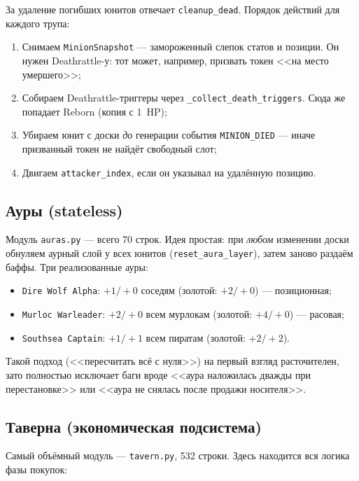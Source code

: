 \documentclass[a4paper,12pt]{extarticle}
\begin{document}
За удаление погибших юнитов отвечает \texttt{cleanup\_dead}. Порядок действий для каждого трупа:

\begin{enumerate}[noitemsep]
  \item Снимаем \texttt{MinionSnapshot} --- замороженный слепок статов и позиции. Он нужен Deathrattle-у: тот может, например, призвать токен <<на место умершего>>;
  \item Собираем Deathrattle-триггеры через \texttt{\_collect\_death\_triggers}. Сюда же попадает Reborn (копия с 1~HP);
  \item Убираем юнит с доски \emph{до} генерации события \texttt{MINION\_DIED} --- иначе призванный токен не найдёт свободный слот;
  \item Двигаем \texttt{attacker\_index}, если он указывал на удалённую позицию.
\end{enumerate}

\subsection{Ауры (stateless)}

Модуль \texttt{auras.py} --- всего 70 строк. Идея простая: при \emph{любом} изменении доски обнуляем аурный слой у всех юнитов (\texttt{reset\_aura\_layer}), затем заново раздаём баффы. Три реализованные ауры:

\begin{itemize}[noitemsep]
  \item \texttt{Dire Wolf Alpha}: $+1/+0$ соседям (золотой: $+2/+0$) --- позиционная;
  \item \texttt{Murloc Warleader}: $+2/+0$ всем мурлокам (золотой: $+4/+0$) --- расовая;
  \item \texttt{Southsea Captain}: $+1/+1$ всем пиратам (золотой: $+2/+2$).
\end{itemize}

Такой подход (<<пересчитать всё с нуля>>) на первый взгляд расточителен, зато полностью исключает баги вроде <<аура наложилась дважды при перестановке>> или <<аура не снялась после продажи носителя>>.

\subsection{Таверна (экономическая подсистема)}

Самый объёмный модуль --- \texttt{tavern.py}, 532 строки. Здесь находится вся логика фазы покупок:
\end{document}
